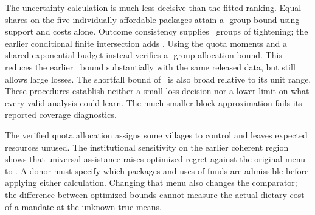 \documentclass[11pt]{article}
\begin{document}
The uncertainty calculation is much less decisive than the fitted ranking. Equal shares on the five individually affordable packages attain a \SupportMeanLoss-group bound using support and costs alone. Outcome consistency supplies \ConsistencyTightening\ groups of tightening; the earlier conditional finite intersection adds \FiniteIncrementOverConsistency. Using the quota moments and a shared exponential budget instead verifies a \QuotaMeanLoss-group allocation bound. This reduces the earlier \TightMeanLoss\ bound substantially with the same released data, but still allows large losses. The shortfall bound of \QuotaShortfallLoss\ is also broad relative to its unit range. These procedures establish neither a small-loss decision nor a lower limit on what every valid analysis could learn. The much smaller block approximation fails its reported coverage diagnostics.

The verified quota allocation assigns some villages to control and leaves expected resources unused. The institutional sensitivity on the earlier coherent region shows that universal assistance raises optimized regret against the original menu to \UniversalCommonLoss. A donor must specify which packages and uses of funds are admissible before applying either calculation. Changing that menu also changes the comparator; the difference between optimized bounds cannot measure the actual dietary cost of a mandate at the unknown true means.
\end{document}
